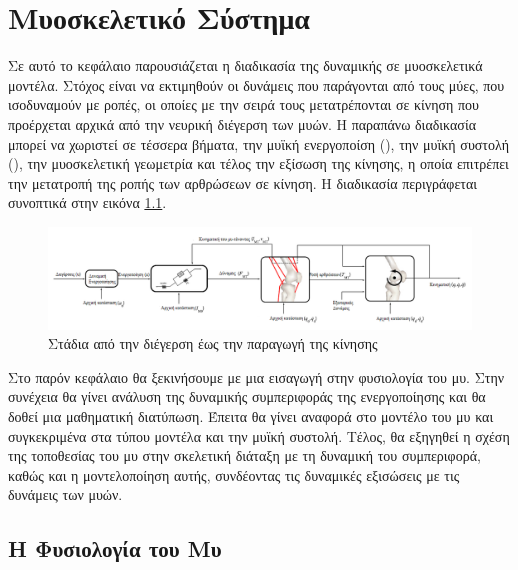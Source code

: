 \chapter{Μυοσκελετικό Σύστημα}

Σε αυτό το κεφάλαιο παρουσιάζεται η διαδικασία της δυναμικής σε μυοσκελετικά μοντέλα. Στόχος είναι να εκτιμηθούν οι δυνάμεις που παράγονται από τους μύες, που ισοδυναμούν με ροπές, οι οποίες με την σειρά τους μετατρέπονται σε κίνηση που προέρχεται αρχικά από την νευρική διέγερση των μυών. Η παραπάνω διαδικασία μπορεί να χωριστεί σε τέσσερα βήματα, την μυϊκή ενεργοποίση (), την μυϊκή συστολή (), την μυοσκελετική γεωμετρία και τέλος την εξίσωση της κίνησης, η οποία επιτρέπει την μετατροπή της ροπής των αρθρώσεων σε κίνηση. Η διαδικασία περιγράφεται συνοπτικά στην εικόνα \ref{fig:muscle-excitation-force}.

\begin{figure}[H]
    \centering
    \includegraphics[width=1.0\textwidth, keepaspectratio]{fig/muscle-excitation-force.png}
    \caption{Στάδια από την διέγερση έως την παραγωγή της κίνησης \cite{erdemir07}}
    \label{fig:muscle-excitation-force}
\end{figure}

Στο παρόν κεφάλαιο θα ξεκινήσουμε με μια εισαγωγή στην φυσιολογία του μυ. Στην συνέχεια θα γίνει ανάλυση της δυναμικής συμπεριφοράς της ενεργοποίησης και θα δοθεί μια μαθηματική διατύπωση. Έπειτα θα γίνει αναφορά στο μοντέλο του μυ και συγκεκριμένα στα  τύπου μοντέλα και την μυϊκή συστολή. Τέλος, θα εξηγηθεί η σχέση της τοποθεσίας του μυ στην σκελετική διάταξη  με τη δυναμική του συμπεριφορά, καθώς και η μοντελοποίηση αυτής, συνδέοντας τις δυναμικές εξισώσεις με τις δυνάμεις των μυών.

\section{H Φυσιολογία του Μυ}

